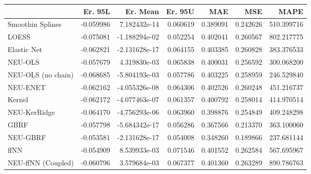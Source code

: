 \begin{tabular}{lrrrrrr}
\toprule
{} &   Er. 95L &      Er. Mean &   Er. 95U &       MAE &       MSE &        MAPE \\
\midrule
Smoothin Splines   & -0.059986 &  7.182432e-14 &  0.060619 &  0.389091 &  0.242626 &  510.399716 \\
LOESS              & -0.075081 & -1.188294e-02 &  0.052254 &  0.402041 &  0.260567 &  802.217775 \\
Elastic Net        & -0.062821 & -2.131628e-17 &  0.064155 &  0.403385 &  0.260828 &  383.376533 \\
NEU-OLS            & -0.057679 &  4.319830e-03 &  0.065838 &  0.400031 &  0.256592 &  300.068200 \\
NEU-OLS (no chain) & -0.068685 & -5.804193e-03 &  0.057786 &  0.403225 &  0.258959 &  246.529840 \\
NEU-ENET           & -0.062162 & -4.055326e-08 &  0.064306 &  0.402526 &  0.260248 &  451.216737 \\
Kernel             & -0.062172 & -4.077463e-07 &  0.061357 &  0.400792 &  0.258014 &  414.970514 \\
NEU-KerRidge       & -0.064170 & -4.756293e-06 &  0.063960 &  0.398876 &  0.254849 &  409.248298 \\
GBRF               & -0.057798 & -5.684342e-17 &  0.056286 &  0.367566 &  0.213370 &  363.100060 \\
NEU-GBRF           & -0.053581 & -2.131628e-17 &  0.054008 &  0.348260 &  0.189866 &  237.681144 \\
ffNN               & -0.054909 &  8.539933e-03 &  0.071546 &  0.401552 &  0.262584 &  567.695967 \\
NEU-ffNN (Coupled) & -0.060796 &  3.579684e-03 &  0.067377 &  0.401360 &  0.263289 &  890.786763 \\
\bottomrule
\end{tabular}
